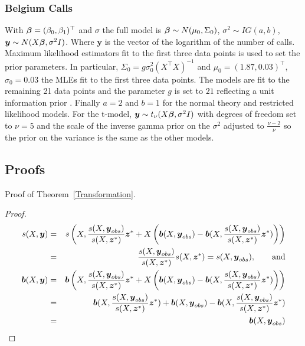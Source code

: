 \documentclass[11pt]{article}
\def\bbeta{\mbox{\boldmath $\beta$}}
\newcommand{\by}{\mbox{\boldmath $y$}}
\newcommand{\bz}{\mbox{\boldmath $z$}}
\newcommand{\bb}{\mbox{\boldmath $b$}}
\newcommand{\mb}{\mathbf}
\begin{document}
\subsubsection{Belgium Calls}
With $\bbeta = (\beta_{0}, \beta_{1})^{\top}$ and $\sigma$ the full model is $\bbeta\sim N(\boldmath{\mu}_{0}, \boldmath{\Sigma}_{0})$, $\sigma^{2} \sim IG(a, b)$, $\by \sim N(X\bbeta, \sigma^{2} I)$. Where $\mb y$ is the vector of the logarithm of the number of calls. Maximum likelihood estimators fit to the first three data points is used to set the prior parameters. In particular, $\Sigma_{0} = g\sigma_{0}^2 (X^{\top}X)^{-1}$ and $\mu_{0} = (1.87,  0.03)^{\top}$, $\sigma_{0} = 0.03$ the MLEs fit to the first three data points. The models are fit to the remaining 21 data points and the parameter $g$ is set to $21$ reflecting a unit information prior \cite{}. Finally $a = 2$ and $b =1$ for the normal theory and restricted likelihood models. For the t-model,  $\by \sim t_{\nu}(X\bbeta, \sigma^{2} I)$ with degrees of freedom set to $\nu = 5$ and the scale of the inverse gamma prior on the $\sigma^{2}$ adjusted to $\frac{\nu-2}{\nu}$ so the prior on the variance is the same as the other models.

\subsection{Proofs}
\noindent

Proof of Theorem~\ref{Transformation}.  
\begin{proof} 
\begin{eqnarray}
 s(X,\by) & = & s\left(X,\frac{s(X,\by_{obs})}{s(X,\bz^*)}\bz^* + X\left(\bb(X,\by_{obs}) - \bb(X,\frac{s(X,\by_{obs})}{s(X,\bz^*)}\bz^*)\right)\right) \\
& = & \frac{s(X,\by_{obs})}{s(X,\bz^*)} s(X, \bz^*)= s(X,\by_{obs}) , \qquad \mbox{and} \\
 \bb(X,\by) & = & \bb\left(X,\frac{s(X,\by_{obs})}{s(X,\bz^*)}\bz^* + X\left(\bb(X,\by_{obs}) - \bb(X,\frac{s(X,\by_{obs})}{s(X,\bz^*)}\bz^*)\right)\right) \\
 & = & \bb(X,\frac{s(X,\by_{obs})}{s(X,\bz^*)}\bz^*) + \bb(X,\by_{obs}) - \bb(X,\frac{s(X,\by_{obs})}{s(X,\bz^*)}\bz^*) \\ &=& \bb(X,\by_{obs})
\end{eqnarray}
\end{proof}
\end{document}
